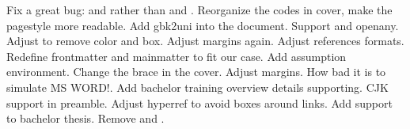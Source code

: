 {}\markdownRendererUlBegin
\markdownRendererUlItem Fix a great bug:  and  rather than  and .\markdownRendererUlItemEnd 
\markdownRendererUlItem Reorganize the codes in cover, make the pagestyle more readable.\markdownRendererUlItemEnd 
\markdownRendererUlItem Add gbk2uni into the document.\markdownRendererUlItemEnd 
\markdownRendererUlItem Support  and openany.\markdownRendererUlItemEnd 
\markdownRendererUlItem Adjust  to remove color and box.\markdownRendererUlItemEnd 
\markdownRendererUlItem Adjust margins again.\markdownRendererUlItemEnd 
\markdownRendererUlItem Adjust references formats.\markdownRendererUlItemEnd 
\markdownRendererUlItem Redefine frontmatter and mainmatter to fit our case.\markdownRendererUlItemEnd 
\markdownRendererUlItem Add assumption environment.\markdownRendererUlItemEnd 
\markdownRendererUlItem Change the brace in the cover.\markdownRendererUlItemEnd 
\markdownRendererUlEnd \markdownRendererInterblockSeparator
{}\markdownRendererInterblockSeparator
{}\markdownRendererInterblockSeparator
{}\markdownRendererUlBegin
\markdownRendererUlItem Adjust margins. How bad it is to simulate MS WORD!.\markdownRendererUlItemEnd 
\markdownRendererUlItem Add bachelor training overview details supporting.\markdownRendererUlItemEnd 
\markdownRendererUlItem CJK support in preamble.\markdownRendererUlItemEnd 
\markdownRendererUlItem Adjust hyperref to avoid boxes around links.\markdownRendererUlItemEnd 
\markdownRendererUlEnd \markdownRendererInterblockSeparator
{}\markdownRendererInterblockSeparator
{}\markdownRendererInterblockSeparator
{}\markdownRendererUlBegin
\markdownRendererUlItem Add support to bachelor thesis.\markdownRendererUlItemEnd 
\markdownRendererUlItem Remove  and .\markdownRendererUlItemEnd 
